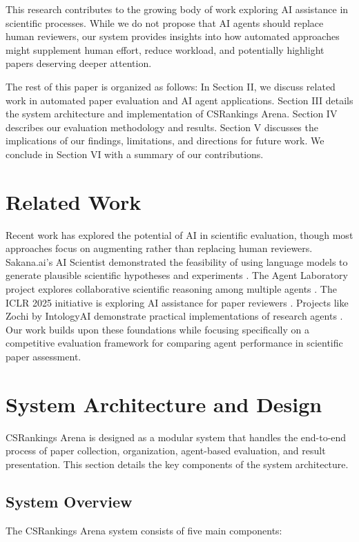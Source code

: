 \documentclass[conference]{IEEEtran}
\begin{document}
This research contributes to the growing body of work exploring AI assistance in scientific processes. While we do not propose that AI agents should replace human reviewers, our system provides insights into how automated approaches might supplement human effort, reduce workload, and potentially highlight papers deserving deeper attention.

The rest of this paper is organized as follows: In Section II, we discuss related work in automated paper evaluation and AI agent applications. Section III details the system architecture and implementation of CSRankings Arena. Section IV describes our evaluation methodology and results. Section V discusses the implications of our findings, limitations, and directions for future work. We conclude in Section VI with a summary of our contributions.

\section{Related Work}
Recent work has explored the potential of AI in scientific evaluation, though most approaches focus on augmenting rather than replacing human reviewers. Sakana.ai's AI Scientist demonstrated the feasibility of using language models to generate plausible scientific hypotheses and experiments \cite{sakana2024}. The Agent Laboratory project explores collaborative scientific reasoning among multiple agents \cite{agentlab2024}. The ICLR 2025 initiative is exploring AI assistance for paper reviewers \cite{iclr2025}. Projects like Zochi by IntologyAI demonstrate practical implementations of research agents \cite{intology2024}. Our work builds upon these foundations while focusing specifically on a competitive evaluation framework for comparing agent performance in scientific paper assessment.

\section{System Architecture and Design}
CSRankings Arena is designed as a modular system that handles the end-to-end process of paper collection, organization, agent-based evaluation, and result presentation. This section details the key components of the system architecture.

\subsection{System Overview}
The CSRankings Arena system consists of five main components:
\end{document}

